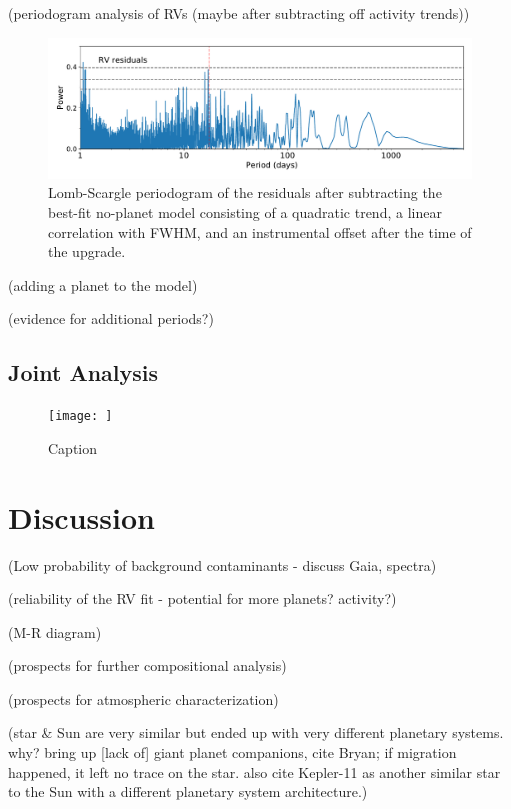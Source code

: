 \documentclass[modern]{aastex62}
\begin{document}
(periodogram analysis of RVs (maybe after subtracting off activity trends))

\begin{figure}
    \centering
    \includegraphics[width=\textwidth]{periodogram_resids1.pdf}
    \caption{Lomb-Scargle periodogram of the \RV residuals after subtracting the best-fit no-planet model consisting of a quadratic trend, a linear correlation with FWHM, and an instrumental offset after the time of the \HARPS upgrade.}
    \label{fig:periodogram_resids1}
\end{figure}

(adding a planet to the model)

(evidence for additional periods?)

\subsection{Joint Analysis}
\label{s:analysis:joint}

\begin{figure}
    \centering
    \texttt{[image: ]}
    \caption{Caption}
    \label{fig:my_label}
\end{figure}


\section{Discussion}
\label{s:discussion}


(Low probability of background contaminants - discuss Gaia, spectra)

(reliability of the RV fit - potential for more planets? activity?)

(M-R diagram)

(prospects for further compositional analysis)

(prospects for atmospheric characterization)

(star \& Sun are very similar but ended up with very different planetary systems. why? bring up [lack of] giant planet companions, cite Bryan; if migration happened, it left no trace on the star. also cite Kepler-11 as another similar star to the Sun with a different planetary system architecture.)
\end{document}
